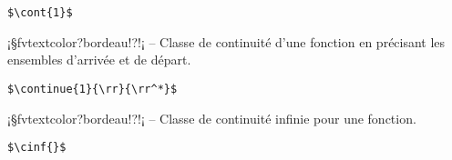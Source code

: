 \documentclass[11pt,a4paper,rgb]{report}
\begin{document}
\setlength{\leftskip}{.75cm}%
\setlength{\textwidth}{17.25cm}%

\colorbox{blue!15}{}
\hfill
\begin{minipage}{.65\textwidth}
	\begin{lstlisting}[linewidth=\textwidth, language={[LaTeX]TeX}]
	$\cont{1}$
	\end{lstlisting}
\end{minipage}

\setlength{\leftskip}{0pt}
\setlength{\textwidth}{18cm}%


\vspace*{.75cm}

\inCodeStub¡§fvtextcolor?bordeau!?!¡ -- Classe de continuité d'une fonction en précisant les ensembles d'arrivée et de départ.

\setlength{\leftskip}{.75cm}%
\setlength{\textwidth}{17.25cm}%

\colorbox{blue!15}{}
\hfill
\begin{minipage}{.65\textwidth}
	\begin{lstlisting}[linewidth=\textwidth, language={[LaTeX]TeX}]
	$\continue{1}{\rr}{\rr^*}$
	\end{lstlisting}
\end{minipage}

\setlength{\leftskip}{0pt}
\setlength{\textwidth}{18cm}%


\vspace*{.75cm}

\inCodeStub¡§fvtextcolor?bordeau!?\cinf{}!¡ -- Classe de continuité infinie pour une fonction.

\setlength{\leftskip}{.75cm}%
\setlength{\textwidth}{17.25cm}%

\colorbox{blue!15}{}
\hfill
\begin{minipage}{.65\textwidth}
	\begin{lstlisting}[linewidth=\textwidth, language={[LaTeX]TeX}]
	$\cinf{}$
	\end{lstlisting}
\end{minipage}

\setlength{\leftskip}{0pt}
\setlength{\textwidth}{18cm}%


\vspace*{.75cm}
\end{document}
